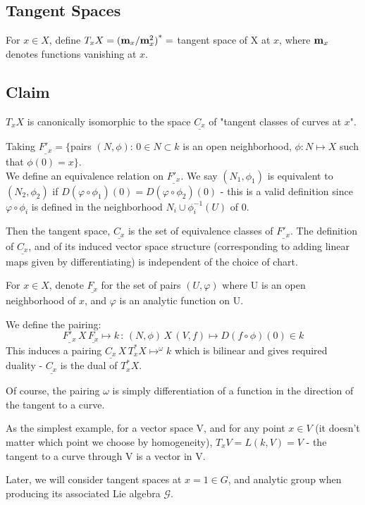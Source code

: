 \subsection{Tangent Spaces}\label{df2.1.2}

For $x\in X$, define $T_x X = {( {\textbf m_x}/{\textbf m^2_x})}^*
= $ tangent space of X at $x$, where $\textbf m_x$ denotes
functions vanishing at $x$.

\subsection*{Claim} $T_x X$ is canonically isomorphic to the
space $\underline{C_x}$ of "tangent classes of curves at $x$".

Taking $\underline{F'_x} = \{$pairs $(N, \phi):\, 0\in N \subset
k$ is an open neighborhood, $\phi:N\mapsto X$ such that $\phi (0)
= x \}$. \\
We define an equivalence relation on $\underline{F'_x}$. We say
$(N_1, \phi_1)$ is equivalent to $(N_2, \phi_2)$ if $D(\varphi
\circ \phi_1)(0) = D(\varphi \circ \phi_2)(0)$ - this is a valid
definition since $\varphi \circ \phi_i$ is defined in the
neighborhood $N_i\cup \phi_i^{-1} (U)$ of 0.

Then the tangent space, $\underline{C_x}$ is the set of
equivalence classes of $\underline{F'_x}$. The definition of
$\underline{C_x}$, and of its induced vector space structure
(corresponding to adding linear maps given by differentiating) is
independent of the choice of chart.

For $x\in X$, denote $\underline{F_x}$ for the set of pairs
$(U,\varphi)$ where U is an open neighborhood of $x$, and
$\varphi$ is an analytic function on U.

We define the pairing:
$$\underline{F'_x} \, X\, \underline{F_x} \mapsto k\,:\, (N,\phi)
\, X \, (V,f) \mapsto D(f\circ \phi )(0) \in k$$ This induces a
pairing $\underline{C_x}\, X\, T_x^* X \mapsto^\omega k$ which is
bilinear and gives required duality - $\underline{C_x}$ is the
dual of $T_x^* X$.

Of course, the pairing $\omega$ is simply differentiation of a
function in the direction of the tangent to a curve.

As the simplest example, for a vector space V, and for any point
$x\in V$ (it doesn't matter which point we choose by homogeneity),
$T_x V = L(k,V) = V$ - the tangent to a curve through V is a
vector in V.

Later, we will consider tangent spaces at $x=1\in G$, and analytic
group when producing its associated Lie algebra $\mathcal G$.






